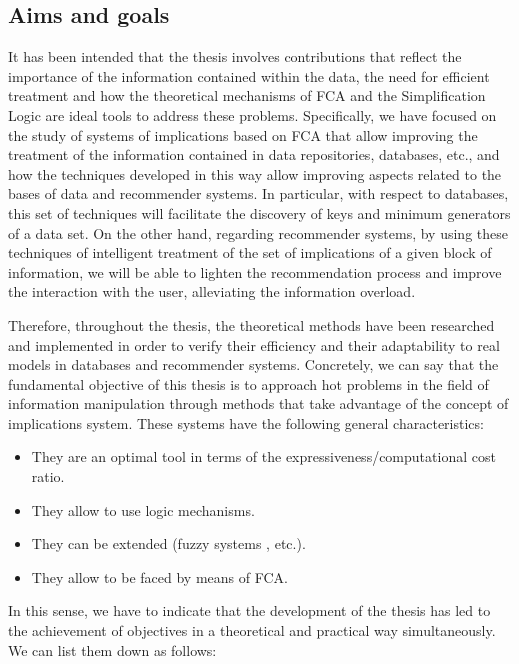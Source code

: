 \subsection*{Aims and goals}
It has been intended that the thesis involves contributions that reflect the importance of the information contained within the data, the need for efficient treatment and how the theoretical mechanisms of FCA and the Simplification Logic are ideal tools to address these problems. Specifically, we have focused on the study of systems of implications based on FCA that allow improving the treatment of the information contained in data repositories, databases, etc., and how the techniques developed in this way allow improving aspects related to the bases of data and recommender systems. In particular, with respect to databases, this set of techniques will facilitate the discovery of keys and minimum generators of a data set. On the other hand, regarding recommender systems, by using these techniques of intelligent treatment of the set of implications of a given block of information, we will be able to lighten the recommendation process and improve the interaction with the user, alleviating the information overload.


Therefore, throughout the thesis, the theoretical methods have been researched and implemented in order to verify their efficiency and their adaptability to real models in databases and recommender systems. Concretely, we can say that the fundamental objective of this thesis is to approach hot problems in the field of information manipulation through methods that take advantage of the concept of implications system. These systems have the following general characteristics:
\begin{itemize}
	\item They are an optimal tool in terms of the expressiveness/computational cost ratio.
	\item They allow to use logic mechanisms.
	\item They can be extended (fuzzy systems \cite{Belohlavek2016}, etc.).
	\item They allow to be faced by means of FCA.
\end{itemize}

In this sense, we have to indicate that the development of the thesis has led to the achievement of objectives in a theoretical and practical way simultaneously. We can list them down as follows:

